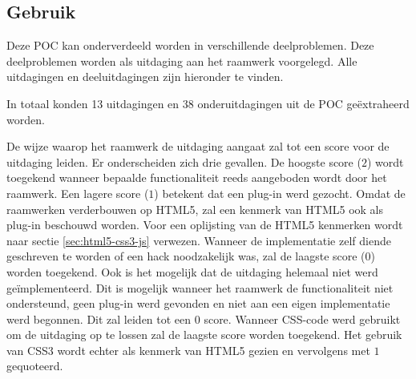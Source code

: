
\subsection{Gebruik}
\label{sec:vergelijking-gebruik}

Deze POC kan onderverdeeld worden in verschillende deelproblemen.
Deze deelproblemen worden als uitdaging aan het raamwerk voorgelegd.
Alle uitdagingen en deeluitdagingen zijn hieronder te vinden.

{}

In totaal konden 13 uitdagingen en 38 onderuitdagingen uit de POC geëxtraheerd worden.


De wijze waarop het raamwerk de uitdaging aangaat zal tot een score voor de uitdaging leiden.
Er onderscheiden zich drie gevallen.
De hoogste score ($2$) wordt toegekend wanneer bepaalde functionaliteit reeds aangeboden wordt door het raamwerk. 
Een lagere score ($1$) betekent dat een plug-in werd gezocht.
Omdat de raamwerken verderbouwen op HTML5, zal een kenmerk van HTML5 ook als plug-in beschouwd worden.
Voor een oplijsting van de HTML5 kenmerken wordt naar sectie \ref{sec:html5-css3-js} verwezen.
Wanneer de implementatie zelf diende geschreven te worden of een hack noodzakelijk was, zal de laagste score ($0$) worden toegekend.
Ook is het mogelijk  dat de uitdaging helemaal niet werd geïmplementeerd.
Dit is mogelijk wanneer het raamwerk de functionaliteit niet ondersteund,  geen plug-in werd gevonden en niet aan een eigen implementatie werd begonnen.
Dit zal leiden tot een $0$ score.
Wanneer CSS-code werd gebruikt om de uitdaging op te lossen zal de laagste score worden toegekend.
Het gebruik van CSS3 wordt echter als kenmerk van HTML5 gezien en vervolgens met $1$ gequoteerd.

